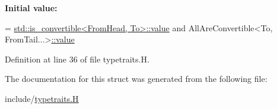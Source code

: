 {\bfseries Initial value\+:}
\begin{DoxyCode}
=
      \hyperlink{namespace_designar_a7dd2a7b6d96f664ce612b506c8eb2fb8}{std::is\_convertible<FromHead, To>::value} and
      AllAreConvertible<To, FromTail...>\hyperlink{struct_designar_1_1_all_are_convertible_a698b71c73875452298bc2e96935240c3}{::value}
\end{DoxyCode}


Definition at line 36 of file typetraits.\+H.



The documentation for this struct was generated from the following file\+:\begin{DoxyCompactItemize}
\item 
include/\hyperlink{typetraits_8_h}{typetraits.\+H}\end{DoxyCompactItemize}
